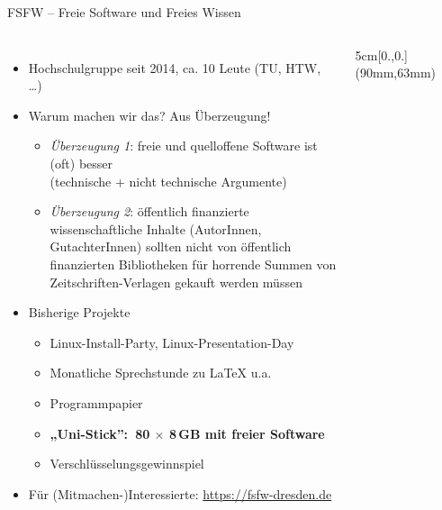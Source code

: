 \documentclass{beamer}
\begin{document}
\begin{frame}{FSFW – Freie Software und Freies Wissen}

  \begin{columns}
 
\vspace{-5mm}
  \begin{itemize}
  \item Hochschulgruppe seit 2014, ca. 10 Leute (TU, HTW, …)
  \item Warum machen wir das? Aus Überzeugung!

  \begin{itemize}
  \item \emph{Überzeugung 1}: freie und quelloffene Software ist (oft) besser\\
    (technische + nicht technische Argumente)\\
    \bigskip
    \pause
  \item \emph{Überzeugung 2}: öffentlich finanzierte wissenschaftliche Inhalte
    (AutorInnen, GutachterInnen) sollten nicht von öffentlich finanzierten
    Bibliotheken für horrende Summen von Zeitschriften-Verlagen gekauft werden
    müssen
  \end{itemize}

    \pause
  \item Bisherige Projekte
    \begin{itemize}
    \item Linux-Install-Party, Linux-Presentation-Day
    \item Monatliche Sprechstunde zu \LaTeX{} u.a.
    \item Programmpapier
    \item \textbf<4-5>{„Uni-Stick”:~80 $\times$ 8\,GB mit freier Software}
    \item Verschlüsselungsgewinnspiel
    \end{itemize}
    \pause
    \pause
    \pause
    \item Für (Mitmachen-)Interessierte: \url{https://fsfw-dresden.de}
  \end{itemize}
  
\begin{textblock*}{5cm}[0.,0.](90mm,63mm)
\end{textblock*}  

~
\end{columns}
\end{frame}
\end{document}
